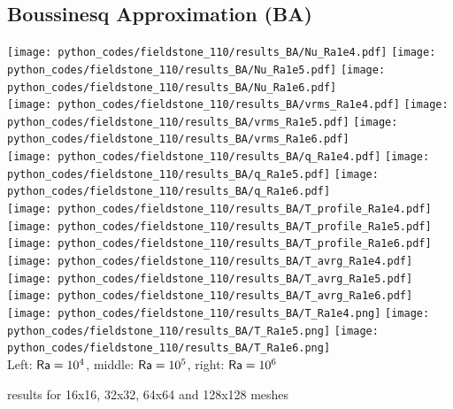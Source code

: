 \newpage
\subsection*{Boussinesq Approximation (BA)}

\begin{center}
\texttt{[image: python\_codes/fieldstone\_110/results\_BA/Nu\_Ra1e4.pdf]}
\texttt{[image: python\_codes/fieldstone\_110/results\_BA/Nu\_Ra1e5.pdf]}
\texttt{[image: python\_codes/fieldstone\_110/results\_BA/Nu\_Ra1e6.pdf]}\\
\texttt{[image: python\_codes/fieldstone\_110/results\_BA/vrms\_Ra1e4.pdf]}
\texttt{[image: python\_codes/fieldstone\_110/results\_BA/vrms\_Ra1e5.pdf]}
\texttt{[image: python\_codes/fieldstone\_110/results\_BA/vrms\_Ra1e6.pdf]}\\
\texttt{[image: python\_codes/fieldstone\_110/results\_BA/q\_Ra1e4.pdf]}
\texttt{[image: python\_codes/fieldstone\_110/results\_BA/q\_Ra1e5.pdf]}
\texttt{[image: python\_codes/fieldstone\_110/results\_BA/q\_Ra1e6.pdf]}\\
\texttt{[image: python\_codes/fieldstone\_110/results\_BA/T\_profile\_Ra1e4.pdf]}
\texttt{[image: python\_codes/fieldstone\_110/results\_BA/T\_profile\_Ra1e5.pdf]}
\texttt{[image: python\_codes/fieldstone\_110/results\_BA/T\_profile\_Ra1e6.pdf]}\\
\texttt{[image: python\_codes/fieldstone\_110/results\_BA/T\_avrg\_Ra1e4.pdf]}
\texttt{[image: python\_codes/fieldstone\_110/results\_BA/T\_avrg\_Ra1e5.pdf]}
\texttt{[image: python\_codes/fieldstone\_110/results\_BA/T\_avrg\_Ra1e6.pdf]}\\
\texttt{[image: python\_codes/fieldstone\_110/results\_BA/T\_Ra1e4.png]}
\texttt{[image: python\_codes/fieldstone\_110/results\_BA/T\_Ra1e5.png]}
\texttt{[image: python\_codes/fieldstone\_110/results\_BA/T\_Ra1e6.png]}\\
{\captionfont Left: ${\mathsf{Ra}}=10^4$, middle: ${\mathsf{Ra}}=10^5$, right: ${\mathsf{Ra}}=10^6$} 
\end{center}

\newpage
\aspect results for 16x16, 32x32, 64x64 and 128x128 meshes

